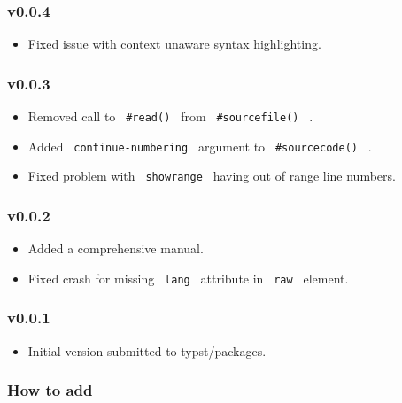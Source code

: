 \subsubsection{v0.0.4}\label{v0.0.4}

\begin{itemize}
\tightlist
\item
  Fixed issue with context unaware syntax highlighting.
\end{itemize}

\subsubsection{v0.0.3}\label{v0.0.3}

\begin{itemize}
\tightlist
\item
  Removed call to \texttt{\ \#read()\ } from \texttt{\ \#sourcefile()\ }
  .
\item
  Added \texttt{\ continue-numbering\ } argument to
  \texttt{\ \#sourcecode()\ } .
\item
  Fixed problem with \texttt{\ showrange\ } having out of range line
  numbers.
\end{itemize}

\subsubsection{v0.0.2}\label{v0.0.2}

\begin{itemize}
\tightlist
\item
  Added a comprehensive manual.
\item
  Fixed crash for missing \texttt{\ lang\ } attribute in
  \texttt{\ raw\ } element.
\end{itemize}

\subsubsection{v0.0.1}\label{v0.0.1}

\begin{itemize}
\tightlist
\item
  Initial version submitted to typst/packages.
\end{itemize}

\subsubsection{How to add}\label{how-to-add}

